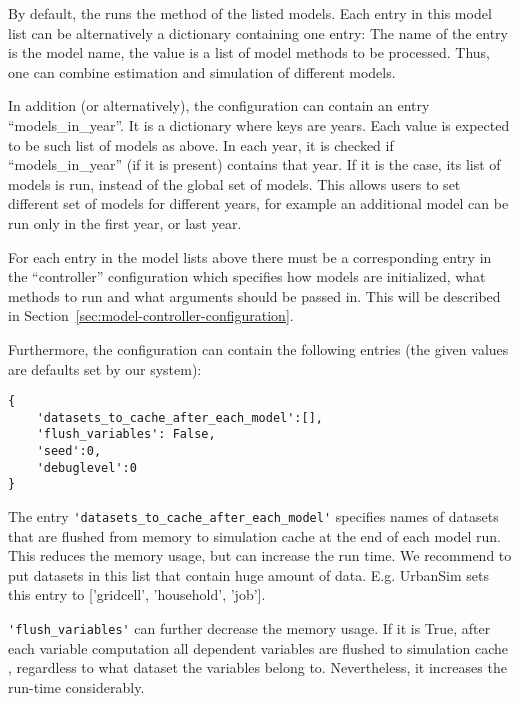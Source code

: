 By default, the  runs the method
 of the listed models. \modelsindex Each entry in this model list can be
alternatively a dictionary containing one entry: The name of the entry is the model
name, the value is a list of model methods to be processed. Thus, one can combine
estimation and simulation of different models. \modelsindex

In addition (or alternatively), the configuration can contain an entry
``models_in_year''. \modelsindex It is a dictionary where keys are years. Each value is
expected to be such list of models \modelsindex as above. In each year, it is checked if
``models_in_year'' \modelsindex (if it is present) contains that year. If it is the case,
its list of models \modelsindex is run, instead of the global set of models. \modelsindex This allows
users to set different set of models \modelsindex for different years, for example an
additional model can be run only in the first year, or last year.

For each entry in the model \modelsindex lists above there must be a corresponding entry in
the ``controller'' configuration which specifies how models \modelsindex are initialized,
what methods to run and what arguments should be passed in. This will be
described in Section~\ref{sec:model-controller-configuration}.

Furthermore, the configuration can contain the following entries (the given
values are defaults set by our system):
\begin{verbatim}
{
    'datasets_to_cache_after_each_model':[],
    'flush_variables': False,
    'seed':0,
    'debuglevel':0
}
\end{verbatim}

The entry \verb|'datasets_to_cache_after_each_model'| specifies names of datasets \datasetindex that
are flushed from memory to simulation cache \simulationcacheindex at the end of each model
run.  This reduces the memory
usage, but can increase the run time. We recommend to put datasets in this list
that contain huge amount of data. E.g. UrbanSim sets this entry to ['gridcell',
'household', 'job'].

\verb|'flush_variables'| can further decrease the memory usage.  If it is True, after each variable
computation all dependent variables are flushed to simulation
cache \simulationcacheindex, regardless to what dataset \datasetindex the variables belong to.
Nevertheless, it increases the run-time considerably.

